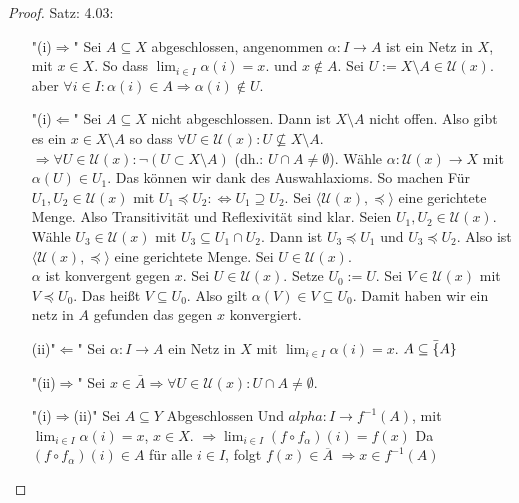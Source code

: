 \begin{proof}{Satz: 4.03:}\\
    \begin{itemize}
        \item["(i)$\Rightarrow$"]
        Sei $A \subseteq X$ abgeschlossen, 
        angenommen $\alpha : I \to A$ ist ein Netz in $X$, mit $x \in X$.
        So dass $\lim_{i \in I} \alpha(i) = x$. und $x \notin A$.
        Sei $U := X \setminus A \in \mathcal{U}(x)$.
        aber $\forall i \in I : \alpha(i) \in A \Rightarrow \alpha(i) \notin U$.
        \item["(i)$\Leftarrow$"]
        Sei $A \subseteq X$ nicht abgeschlossen. 
        Dann ist $X \setminus A$ nicht offen. 
        Also gibt es ein $x \in X \setminus A$ so dass 
        $\forall U \in \mathcal{U}(x) : U \not\subseteq X \setminus A$.
        $\Rightarrow \forall U \in \mathscr{U}(x) : \neg (U \subset X \setminus A)$
        (dh.: $U \cap A \neq \emptyset$).
        Wähle $\alpha : \mathscr{U}(x) \to X$ mit $\alpha(U) \in U_1 $.
        Das können wir dank des Auswahlaxioms. So machen
        Für $U_1, U_2 \in \mathscr{U}(x)$ mit $U_1 \preceq U_2 : \Leftrightarrow U_1 \supseteq U_2$.
        Sei $\langle \mathscr{U}(x), \preceq \rangle$ eine gerichtete Menge.
        Also Transitivität und Reflexivität sind klar.
        Seien $U_1, U_2 \in \mathscr{U}(x)$.
        Wähle $U_3 \in \mathscr{U}(x)$ mit $U_3 \subseteq U_1 \cap U_2$.
        Dann ist $U_3 \preceq U_1$ und $U_3 \preceq U_2$.
        Also ist $\langle \mathscr{U}(x), \preceq \rangle$ eine gerichtete Menge.
        Sei $U \in \mathscr{U}(x)$.\\
        $\alpha$ ist konvergent gegen $x$.
        Sei $U \in \mathscr{U}(x)$. Setze $U_0 := U$.
        Sei $V \in \mathscr{U}(x)$ mit $V \preceq U_0$.
        Das heißt $V \subseteq U_0$.
        Also gilt $\alpha(V) \in V \subseteq U_0$.
        Damit haben wir ein netz in $A$ gefunden das gegen $x$ konvergiert.
        \item[(ii)"$\Leftarrow$"]
        Sei $\alpha : I \to A$ ein Netz in $X$ mit $\lim_{i \in I} \alpha(i) = x$.
        $A \subseteq \bar \{A\}$
        \item["(ii)$\Rightarrow$"]
        Sei $x \in  \bar{A} \Rightarrow 
        \forall U \in \mathcal{U}(x) : U \cap A \neq \emptyset$.
        \item["(i)$\Rightarrow$(ii)"]
        Sei $A \subseteq Y$ Abgeschlossen 
        Und $alpha : I \to f^{-1}(A)$, 
        mit $\lim_{i \in I} \alpha(i) = x$, $x \in X$.
        $\Rightarrow \lim_{i \in I} (f \circ f_\alpha)(i) = f(x)$
        Da $(f \circ f_\alpha)(i) \in A$ für alle $i \in I$, folgt  
        $f(x) \in \overline{A}$
        $\Rightarrow  x \in f^{-1}(A)$
        \end{itemize}
        
\end{proof}